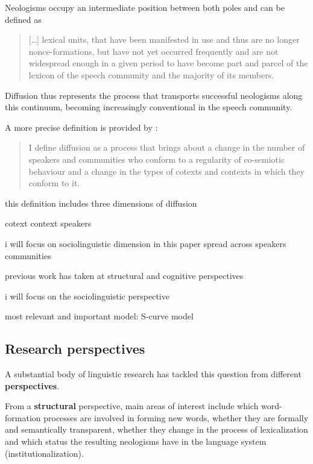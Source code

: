 \documentclass[draft, a4paper, abstract=on]{scrartcl}
\renewcommand{\hw}[1]{\textbf{#1}}
\begin{document}
Neologisms occupy an intermediate position between both poles and can be defined as

\blockquote[{\cite[31]{Kerremans2015WebNew}}]{
[\dots] lexical units, that have been manifested in use and thus are no longer nonce-formations, but have not yet occurred frequently and are not widespread enough in a given period to have become part and parcel of the lexicon of the speech community and the majority of its members.
}

Diffusion thus represents the process that transports successful neologisms along this continuum, becoming increasingly conventional in the speech community.

A more precise definition is provided by \citeauthor{Schmid2020DynamicsLinguistic}: \blockquote[\cite{Schmid2020DynamicsLinguistic}]{I define diffusion as a process that brings about a change in the number of speakers and communities who conform to a regularity of co-semiotic behaviour and a change in the types of cotexts and contexts in which they conform to it.} 

this definition includes three dimensions of diffusion

  cotext
  context
  speakers

i will focus on sociolinguistic dimension in this paper
  spread across
    speakers
    communities

previous work has taken at
  structural and
  cognitive perspectives

i will focus on the sociolinguistic perspective

most relevant and important model: S-curve model

  \subsection{Research perspectives}

  A substantial body of linguistic research has tackled this question from different \hw{perspectives}. \parencite[16]{Schmid2016EnglishMorphology}

  From a \hw{structural} perspective, main areas of interest include which word-formation processes are involved in forming new words, whether they are formally and semantically transparent, whether they change in the process of lexicalization and which status the resulting neologisms have in the language system (institutionalization). \parencite[e.g.][]{Bauer1983EnglishWordformation, Lipka2005LexicalizationInstitutionalization}
\end{document}
